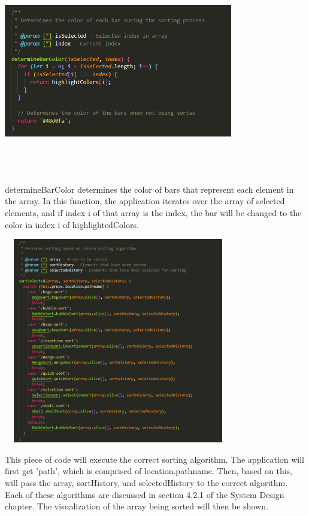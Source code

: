 \begin{center}
    \includegraphics[width=10cm,height=9cm,keepaspectratio]{images/mainpage7}
\end{center}
determineBarColor determines the color of bars that represent each element in the array. In this function, the application iterates over the array of selected elements, and if index i of that array is the index, the bar will be changed to the color in index i of highlightedColors.

\newpage
\begin{center}
    \includegraphics[width=10cm,height=9cm,keepaspectratio]{images/mainpage6}
\end{center}
This piece of code will execute the correct sorting algorithm. The application will first get 'path', which is comprised of location.pathname. Then, based on this, will pass the array, sortHistory, and selectedHistory to the correct algorithm. Each of these algorithms are discussed in section 4.2.1 of the System Design chapter. The visualization of the array being sorted will then be shown.

